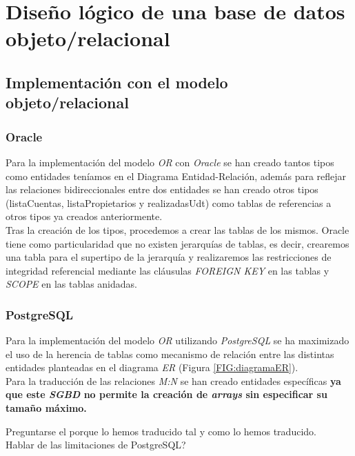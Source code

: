 \documentclass{article}
\begin{document}
\section{Diseño lógico de una base de datos objeto/relacional}
\subsection{Implementación con el modelo objeto/relacional}
\subsubsection{Oracle}
Para la implementación del modelo \emph{OR} con \emph{Oracle} se han creado tantos tipos como entidades teníamos en el Diagrama Entidad-Relación, además para reflejar las relaciones bidireccionales entre dos entidades se han creado otros tipos (listaCuentas, listaPropietarios y realizadasUdt) como tablas de referencias a otros tipos ya creados anteriormente.
\\
Tras la creación de los tipos, procedemos a crear las tablas de los mismos. Oracle tiene como particularidad que no existen jerarquías de tablas, es decir, crearemos una tabla para el supertipo de la jerarquía y realizaremos las restricciones de integridad referencial mediante las cláusulas \emph{FOREIGN KEY} en las tablas y \emph{SCOPE} en las tablas anidadas.
\\

\subsubsection{PostgreSQL}

Para la implementación del modelo \emph{OR} utilizando \emph{PostgreSQL} se ha maximizado el uso de la herencia de tablas como mecanismo de relación entre las distintas entidades planteadas en el diagrama \emph{ER} (Figura \ref{FIG:diagramaER}).\\
Para la traducción de las relaciones \emph{M:N} se han creado entidades específicas \textbf{ya que este \emph{SGBD} no permite la creación de \emph{arrays} sin especificar su tamaño máximo.}\\

\begin{Large}
	Preguntarse el porque lo hemos traducido tal y como lo hemos traducido.\\
	
	Hablar de las limitaciones de PostgreSQL?
\end{Large}
\\
\end{document}
